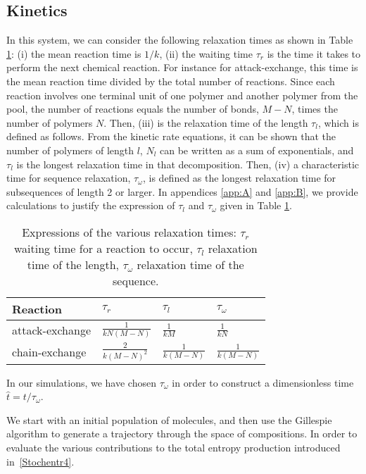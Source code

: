 \documentclass[
	amsmath,
	amssymb,
	a4paper,
	aip,		%
	jcp,		%
	reprint, twocolumn  %
	fleqn,
	showpacs,
	floatfix
]{revtex4-1}
\begin{document}
\subsection{Kinetics}
In this system, we can consider the following relaxation times as shown in Table \ref{table:bounds}: 
(i) the mean reaction time is $1/k$, 
(ii) the waiting time  $\tau_{r}$ is the time it takes to perform the next chemical reaction.
For instance for attack-exchange, this time is the mean reaction time divided by the total number 
of reactions. Since each reaction involves one terminal unit of one polymer and 
another polymer from the pool, the number of reactions equals the number of bonds, $M-N$, times the number of polymers $N$.
Then, (iii) is the relaxation time of the length $\tau_l$, which is defined as follows.
From the kinetic rate equations, it can be shown that the number of polymers of length $l$, $N_l$
can be written as a sum of exponentials, and $\tau_l$ is the longest relaxation time in that decomposition.
Then, (iv) a characteristic time for sequence relaxation, $\tau_\omega$, is defined as the
 longest relaxation time for subsequences of length 2 or larger. In appendices \ref{app:A} and \ref{app:B},
we provide calculations to justify the expression of $\tau_l$ and $\tau_\omega$ given in Table \ref{table:bounds}.
\begin{table}[H]
	{\renewcommand{\arraystretch}{1.5}%
    \begin{tabular}{ | p{2.5cm}  |  p{2cm} | p{1cm} | p{1cm} |}
    \hline
    Reaction & $\tau_{r}$ & $\tau_{l}$ & $\tau_{\omega}$   \\ \hline
    attack-exchange & $\frac{1}{k N (M-N)}$ & $\frac{1}{k M}$ & $\frac{1}{k N}$    \\ \hline
    chain-exchange & $\frac{2}{ k (M-N)^2}$ & $\frac{1}{k (M-N)}$ & $\frac{1}{k (M-N)}$  \\ \hline
    \end{tabular}
    \caption{Expressions of the various relaxation times: $\tau_r$ waiting time for a reaction to occur, $\tau_l$ relaxation time of 
the length, $\tau_\omega$ relaxation time of the sequence.}
    \label{table:bounds}} \quad
\end{table}
In our simulations, we have chosen $\tau_{\omega}$ in order to construct a dimensionless time $\hat{t}=t / \tau_{\omega}$.

We start with an initial population of molecules, and then use the Gillespie algorithm to generate a trajectory through
the space of compositions. In order to evaluate the various contributions to the total entropy production introduced in~\eqref{Stochentr4}.
\end{document}
